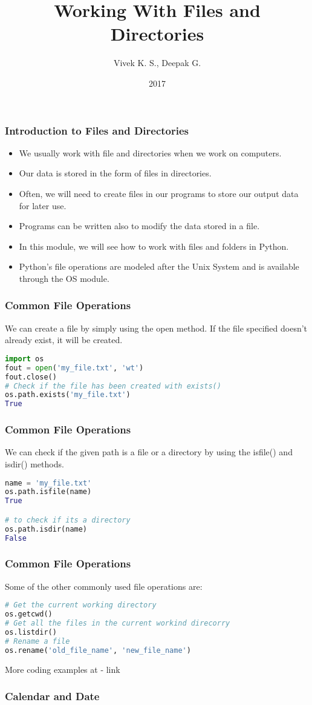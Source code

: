 \documentclass{beamer}
\title{Working With Files and Directories}
\author{Vivek K. S., Deepak G.}
\institute{Information Systems Decision Sciences (ISDS)\\
MUMA College of Business\\
University of South Florida \\
Tampa, Florida}
\date{2017}
\begin{document}
\frame{\titlepage}

\begin{frame}
\frametitle{Introduction to Files and Directories}
\begin{itemize}
\item We usually work with file and directories when we work on computers.
\item Our data is stored in the form of files in directories.
\item Often, we will need to create files in our programs to store our output data for later use.
\item Programs can be written also to modify the data stored in a file.
\item In this module, we will see how to work with files and folders in Python.
\item Python's file operations are modeled after the Unix System and is available through the OS module.
\end{itemize}
\end{frame}

\begin{frame}[fragile]
\frametitle{Common File Operations}
We can create a file by simply using the open method. If the file specified doesn't already exist, it will be created.
\begin{lstlisting}[language=Python]
import os
fout = open('my_file.txt', 'wt')
fout.close()
# Check if the file has been created with exists()
os.path.exists('my_file.txt')
True
\end{lstlisting}
\end{frame}

\begin{frame}[fragile]
\frametitle{Common File Operations}
We can check if the given path is a file or a directory by using the isfile() and isdir() methods.
\begin{lstlisting}[language=Python]
name = 'my_file.txt'
os.path.isfile(name)
True

# to check if its a directory
os.path.isdir(name)
False
\end{lstlisting}
\end{frame}


\begin{frame}[fragile]
\frametitle{Common File Operations}
Some of the other commonly used file  operations are:
\begin{lstlisting}[language=Python]
# Get the current working directory
os.getcwd()
# Get all the files in the current workind direcorry
os.listdir()
# Rename a file
os.rename('old_file_name', 'new_file_name')
\end{lstlisting}

More coding examples at - link
\end{frame}

\begin{frame}
\frametitle{Calendar and Date}
\end{frame}
\end{document}
